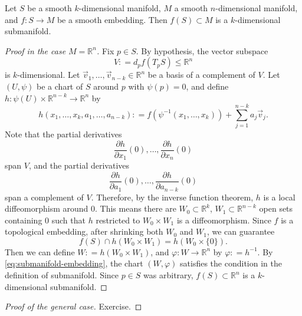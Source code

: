 \documentclass{ximera}
\begin{document}
    \begin{example}
        Let $S$ be a smooth $k$-dimensional manifold, $M$ a smooth $n$-dimensional manifold, and $f : S \to M$ be a smooth embedding. Then $f(S) \subset M$ is a $k$-dimensional submanifold. 



\begin{proof}[Proof in the case $M = \mathbb{R}^n$]
        Fix $p \in S$.  By hypothesis, the vector subspace 
        \[ V : =  d_p f (T_p S)  \leq \mathbb{R}^n  \] 
        is $k$-dimensional.  Let $\Vec{v}_1 , \ldots , \Vec{v}_{n-k} \in \mathbb{R}^n $ be a basis of a complement of $V$.  Let $(U,\psi ) $ be a chart of $S$ around $p$ with $\psi (p) = 0 $, and  define $ h : \psi (U ) \times \mathbb{R}^{n-k}  \to  \mathbb{R}^n $   by
        \[   h (  x_1, \ldots , x_k , a_1, \ldots , a_{n-k}   )  : =  f ( \psi ^{-1}  ( x_1, \ldots , x_k  )) + \sum_{j = 1} ^{n-k} a_j \Vec{v}_j.       \]
        Note that the partial derivatives 
        \[     \frac{\partial h }{\partial x_1} (0) , \ldots, \frac{\partial h }{ \partial x_n } (0)                        \]
        span $V$, and the partial derivatives
        \[     \frac{\partial h }{\partial a_1} (0) , \ldots, \frac{\partial h }{ \partial a_{n-k} } (0)                        \]
        span a complement of $V$. Therefore, by the inverse function theorem, $h$ is a local diffeomorphism around $0$.      This means there are $W_0 \subset \mathbb{R}^k$, $W_1 \subset \mathbb{R}^{n-k}$ open sets containing $0$ such that $h$ restricted to $W_0 \times W_1$ is a diffeomorphism. Since $f$ is a topological embedding, after shrinking both $W_0$ and $W_1$, we can guarantee 
        \begin{equation}\label{eq:submanifold-embedding}
            f  (S)  \cap   h (W_0 \times W_1)  = h(W_0 \times \{ 0 \} ) .  
        \end{equation}
        Then we can define $W : =  h (W_ 0 \times W_1) $, and $\varphi : W \to \mathbb{R}^n$ by $ \varphi : = h^{-1}  $.   By \eqref{eq:submanifold-embedding}, the chart  $(W , \varphi)$ satisfies the condition in the definition of submanifold. Since $p \in S $ was arbitrary, $f(S) \subset \mathbb{R}^n$ is a $k$-dimensional submanifold.
    \end{proof}

    \begin{proof}[Proof of the general case]
        Exercise.
    \end{proof}
    \end{example}
\end{document}
